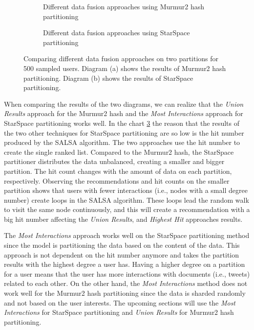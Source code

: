 \begin{figure}[ht!]
    \centering
    \begin{subfigure}{\textwidth}
        \centering
        
        \caption{Different data fusion approaches using Murmur2 hash partitioning}
        \label{plot:murmur2-data-fusion}
    \end{subfigure}\qquad

    \begin{subfigure}{\textwidth}
        \centering
        
        \caption{Different data fusion approaches using StarSpace partitioning}
        \label{plot:star-space-data-fusion}
    \end{subfigure}\qquad
    \caption{Comparing different data fusion approaches on two partitions for 500 sampled users. Diagram (a) shows the results of Murmur2 hash partitioning. Diagram (b) shows the results of StarSpace partitioning.}
\end{figure}


When comparing the results of the two diagrams, we can realize that the \emph{Union Results} approach for the Murmur2 hash and the \emph{Most Interactions} approach for StarSpace partitioning works well. In the chart \ref{plot:star-space-data-fusion} the reason that the results of the two other techniques for StarSpace partitioning are so low is the hit number produced by the SALSA algorithm. The two approaches use the hit number to create the single ranked list. Compared to the Murmur2 hash, the StarSpace partitioner distributes the data unbalanced, creating a smaller and bigger partition. The hit count changes with the amount of data on each partition, respectively. Observing the recommendations and hit counts on the smaller partition shows that users with fewer interactions (i.e., nodes with a small degree number) create loops in the SALSA algorithm. These loops lead the random walk to visit the same node continuously, and this will create a recommendation with a big hit number affecting the \emph{Union Results}, and \emph{Highest Hit} approaches results.


The \emph{Most Interactions} approach works well on the StarSpace partitioning method since the model is partitioning the data based on the content of the data. This approach is not dependent on the hit number anymore and takes the partition results with the highest degree a user has. Having a higher degree on a partition for a user means that the user has more interactions with documents (i.e., tweets) related to each other. On the other hand, the \emph{Most Interactions} method does not work well for the Murmur2 hash partitioning since the data is sharded randomly and not based on the user interests. The upcoming sections will use the \emph{Most Interactions} for StarSpace partitioning and \emph{Union Results} for Murmur2 hash partitioning.


